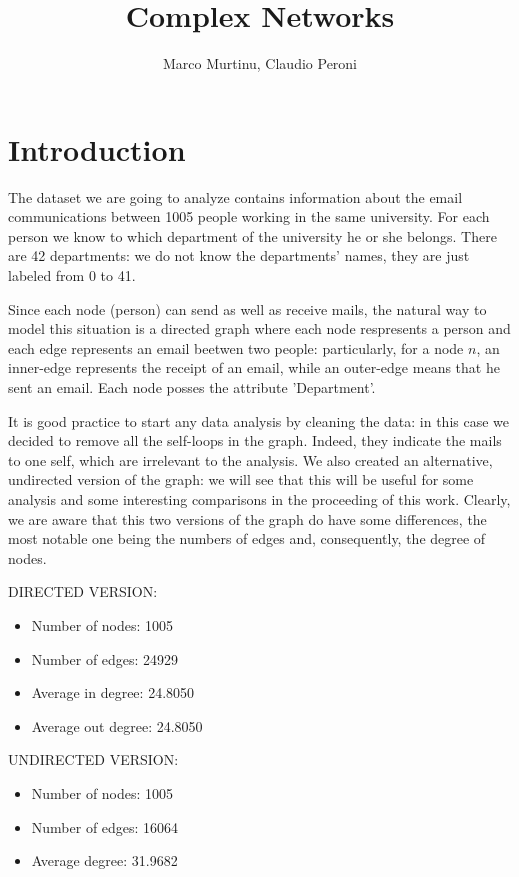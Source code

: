 \documentclass{report}
\title{Complex Networks}
\author{{Marco Murtinu, Claudio Peroni}}
\theoremstyle{definition}
\theoremstyle{remark}
\begin{document}
	\maketitle
\section*{Introduction}	
The dataset we are going to analyze contains information about the email communications between 1005 people working in the same university. For each person we know to which department of the university he or she belongs. There are 42 departments: we do not know the departments' names, they are just labeled from 0 to 41.

Since each node (person) can send as well as receive mails, the natural way to model this situation is a directed graph where each node respresents a person and each edge represents an email beetwen two people: particularly, for a node $n$, an inner-edge represents the receipt of an email, while an outer-edge means that he sent an email. Each node posses the attribute 'Department'.

It is good practice to start any data analysis by cleaning the data: in this case we decided to remove all the self-loops in the graph. Indeed, they indicate the mails to one self, which are irrelevant to the analysis. We also created an alternative, undirected version of the graph: we will see that this will be useful for some analysis and some interesting comparisons in the proceeding of this work. Clearly, we are aware that this two versions of the graph do have some differences, the most notable one being the numbers of edges and, consequently, the degree of nodes.
\bigskip

DIRECTED VERSION:

\begin{itemize}
\item Number of nodes: 1005
\item Number of edges: 24929
\item Average in degree: 24.8050
\item Average out degree: 24.8050
\end{itemize}



UNDIRECTED VERSION:

\begin{itemize}
	\item Number of nodes: 1005
	\item Number of edges: 16064
	\item Average degree: 31.9682
\end{itemize}
\end{document}
